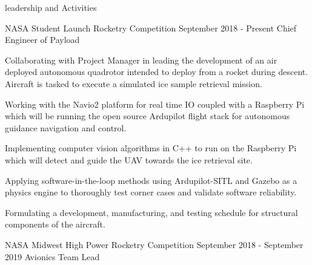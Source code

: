 \documentclass{resume} %
\begin{document}

    \begin{rSection} {leadership and Activities}

        \begin{rSubsection} {NASA Student Launch Rocketry Competition} {September 2018 - Present} {Chief Engineer of Payload}

            \item Collaborating with Project Manager in leading the development of an air deployed autonomous quadrotor intended to deploy from a rocket during descent. Aircraft is tasked to execute a simulated ice sample retrieval mission.
            \item Working with the Navio2 platform for real time IO coupled with a Raspberry Pi which will be running the open source Ardupilot flight stack for autonomous guidance navigation and control.
            \item Implementing computer vision algorithms in C++ to run on the Raspberry Pi which will detect and guide the UAV towards the ice retrieval site.
            \item Applying software-in-the-loop methods using Ardupilot-SITL and Gazebo as a physics engine to thoroughly test corner cases and validate software reliability.
            \item Formulating a development, manufacturing, and testing schedule for structural components of the aircraft.


        \end{rSubsection}



        \begin{rSubsection} {NASA Midwest High Power Rocketry Competition} {September 2018 - September 2019} {Avionics Team Lead}


\end{rSubsection}
\end{rSection}
\end{document}
